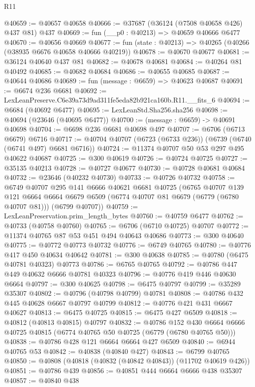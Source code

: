 \begin{lexlean}{R11}
\begin{coremodule}
@40659 := @40657 @40658
@40666 := @37687 (@36124 (@7508 @40658 @426) @437 @81) @437
@40669 := fun (__p0 : @40213) => @40659 @40666 @6477
@40670 := @40656 @40669
@40677 := fun (state : @40213) => @40265 (@40266 (@38935 @6676 @40658 @40666 @40219))
@40678 := @40670 @40677
@40681 := @36124 @40640 @437 @81
@40682 := @40678 @40681
@40684 := @40264 @81 @40492
@40685 := @40682 @40684
@40686 := @40655 @40685
@40687 := @40644 @40686
@40689 := fun (message : @6659) => @40623 @40687
@40691 := @6674 @236 @6681
@40692 := LexLeanPreserve.C6e39a73d9ad311fe5eda82b921ca160b.R11.__fits_6
@40694 := @6684 (@40692 @6477)
@40695 := LexLeanStd.Sha256.sha256
@40698 := @40694 (@23646 (@40695 @6477))
@40700 := (message : @6659) -> @40691 @40698
@40704 := @6698 @236 @6681 @40698 @497
@40707 := @6706 (@6713 @6679) @6716
@40717 := @40704 @40707 (@6723 (@6733 @236)) (@6739 (@6740 (@6741 @497) @6681 @6716))
@40724 := @11374 @40707 @50 @53 @297 @495 @40622 @40687
@40725 := @300 @40619
@40726 := @40724 @40725
@40727 := @35135 @40213
@40728 := @40727 @40677
@40730 := @40728 @40681 @40684
@40732 := @23646 (@40232 @40730)
@40733 := @40726 @40732
@40758 := @6749
    @40707
    @295
    @141
    @6666
    @40621
    @6681
    @40725
    (@6765
      @40707
      @139
      @121
      @6664
      @6664
      @6679
      @6509
      (@6774 @40707 @81 @6679 (@6779 (@6780 @40707 @81)))
      (@6799 @40707))
@40759 := LexLeanPreservation.prim_length_bytes
@40760 := @40759 @6477
@40762 := @40733 (@40758 @40760)
@40765 := @6706 (@6710 @40725) @40707
@40772 := @11374 @40765 @87 @53 @451 @494 @40643 @40686
@40773 := @300 @40640
@40775 := @40772 @40773 @40732
@40776 := @6749 @40765
@40780 := @40776 @417 @450 @40634 @40642
@40781 := @300 @40638
@40785 := @40780 (@6475 @40781 @40323) @40773
@40786 := @6765 @40765
@40792 := @40786 @447 @449 @40632 @6666 @40781 @40323
@40796 := @40776 @419 @446 @40630 @6664
@40797 := @300 @40625
@40798 := @6475 @40797
@40799 := @35289 @35307
@40802 := @40796 (@40798 @40799) @40781
@40808 := @40786 @432 @445 @40628 @6667 @40797 @40799
@40812 := @40776 @421 @431 @6667 @40627
@40813 := @6475 @40725
@40815 := @6475 @427 @6509
@40818 := @40812 (@40813 @40815) @40797
@40832 := @40786
    @152
    @430
    @6664
    @6666
    @40725
    @40815
    (@6774 @40765 @50 @40725 (@6779 (@6780 @40765 @50)))
@40838 := @40786 @428 @121 @6664 @6664 @427 @6509
@40840 := @6944 @40765 @53
@40842 := @40838 (@40840 @427)
@40843 := @6799 @40765
@40850 := @40808 (@40818 (@40832 (@40842 @40843)) (@11702 @40619 @426))
@40851 := @40786 @439
@40856 := @40851 @444 @6664 @6666 @438 @35307
@40857 := @40840 @438

\end{coremodule}
\end{lexlean}
